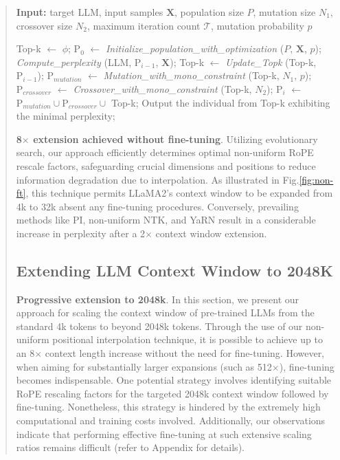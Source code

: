 \begin{abstract}
\begin{algorithm}[t]
	\small
	\caption{The search algorithm}
	\textbf{Input:} target LLM, input samples $\mathbf{X}$, population size $P$, mutation size $N_1$, crossover size $N_2$, maximum iteration count $\mathcal{T}$, mutation probability $p$\\

	\begin{algorithmic}[1]
		\label{alg:search}
		\STATE Top-k $\leftarrow$ $\phi$;	
		\STATE $\text{P}_0$ $\leftarrow$ \textit{Initialize\_population\_with\_optimization} ($P$, $\mathbf{X}$, $p$); 
		\STATE \textit{Compute\_perplexity} (LLM, $\text{P}_{i-1}$, $\mathbf{X}$);
		\STATE Top-k $\leftarrow$ \textit{Update\_Topk} (Top-k, $\text{P}_{i-1}$);
		\STATE $\text{P}_{mutation}$ $\leftarrow$ \textit{Mutation\_with\_mono\_constraint} (Top-k, $N_1$, $p$); 
		\STATE $\text{P}_{crossover}$ $\leftarrow$ \textit{Crossover\_with\_mono\_constraint} (Top-k, $N_2$);
		\STATE $\text{P}_i$ $\leftarrow$ $\text{P}_{mutation} \cup \text{P}_{crossover} \cup$ Top-k;
		\ENDFOR
		\STATE Output the individual from Top-k exhibiting the minimal perplexity;
	\end{algorithmic}
\end{algorithm}

\textbf{8$\times$ extension achieved without fine-tuning}. Utilizing evolutionary search, our approach efficiently determines optimal non-uniform RoPE rescale factors, safeguarding crucial dimensions and positions to reduce information degradation due to interpolation. As illustrated in Fig.\ref{fig:non-ft}, this technique permits LLaMA2's context window to be expanded from 4k to 32k absent any fine-tuning procedures. Conversely, prevailing methods like PI, non-uniform NTK, and YaRN result in a considerable increase in perplexity after a 2$\times$ context window extension.

\subsection{Extending LLM Context Window to 2048K}
\label{sec:extendto2048k}

\textbf{Progressive extension to 2048k}. In this section, we present our approach for scaling the context window of pre-trained LLMs from the standard 4k tokens to beyond 2048k tokens. Through the use of our non-uniform positional interpolation technique, it is possible to achieve up to an 8$\times$ context length increase without the need for fine-tuning. However, when aiming for substantially larger expansions (such as 512$\times$), fine-tuning becomes indispensable. One potential strategy involves identifying suitable RoPE rescaling factors for the targeted 2048k context window followed by fine-tuning. Nonetheless, this strategy is hindered by the extremely high computational and training costs involved. Additionally, our observations indicate that performing effective fine-tuning at such extensive scaling ratios remains difficult (refer to Appendix for details).


\end{abstract}
